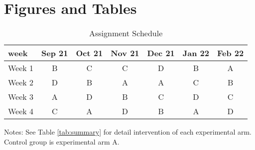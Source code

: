 \documentclass[12pt, a4paper]{article}
\begin{document}
\hypertarget{figtab}{%
\section{Figures and Tables}\label{figtab}}

\begin{table}[H]

\caption{\label{tab:assignment}Assignment Schedule}
\centering
\fontsize{9}{11}\selectfont
\fontsize{9}{11}\selectfont
\begin{threeparttable}
\begin{tabular}[t]{lcccccc}
\toprule
week & Sep 21 & Oct 21 & Nov 21 & Dec 21 & Jan 22 & Feb 22\\
\midrule
Week 1 & B & C & C & D & B & A\\
Week 2 & D & B & A & A & C & B\\
Week 3 & A & D & B & C & D & C\\
Week 4 & C & A & D & B & A & D\\
\bottomrule
\end{tabular}
\begin{tablenotes}
\item Notes: See Table \ref{tab:summary} for detail intervention of each experimental arm. Control group is experimental arm A.
\end{tablenotes}
\end{threeparttable}
\end{table}
\end{document}
